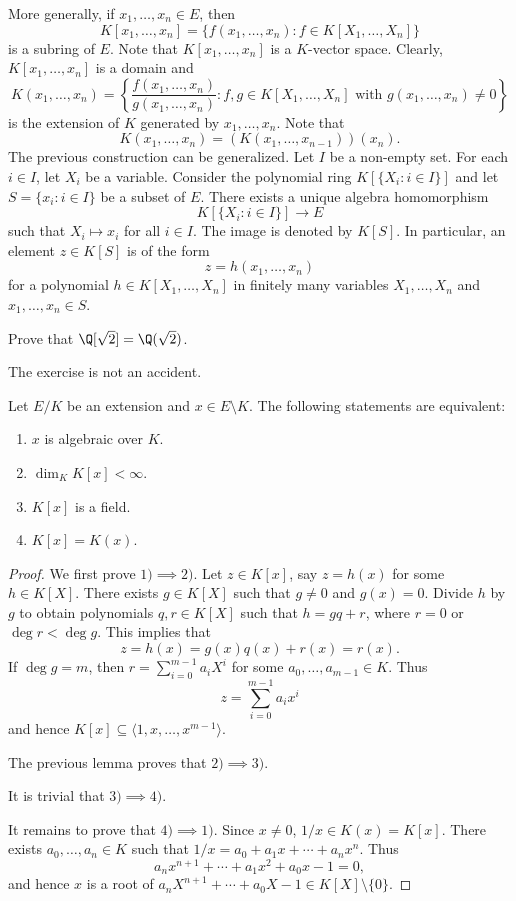 More generally,
if $x_1,\dots,x_n\in E$, then
\[
K[x_1,\dots,x_n]=\{f(x_1,\dots,x_n):f\in K[X_1,\dots,X_n]\}
\]
is a subring of $E$. 
Note that $K[x_1,\dots,x_n]$ is a $K$-vector space. 
Clearly, $K[x_1,\dots,x_n]$ is a domain
and 
\[
K(x_1,\dots,x_n)=\left\{\frac{f(x_1,\dots,x_n)}{g(x_1,\dots,x_n)}:f,g\in K[X_1,\dots,X_n]\text{ with $g(x_1,\dots,x_n)\ne 0$}\right\}
\]
is the extension of $K$ generated by $x_1,\dots,x_n$. 
Note that 
\[
K(x_1,\dots,x_n)=(K(x_1,\dots,x_{n-1}))(x_n).
\]
The previous construction
can be generalized. Let $I$ be a non-empty set. 
For each $i\in I$, let $X_i$ be a variable. Consider
the polynomial ring $K[\{X_i:i\in I\}]$ and let 
$S=\{x_i:i\in I\}$ be a subset of $E$. There exists a unique 
algebra homomorphism 
\[
K[\{X_i:i\in I\}]\to E
\]
such that $X_i\mapsto x_i$ for all $i\in I$. The image 
is denoted by $K[S]$. In particular, an element $z\in K[S]$ 
is of the form 
\[
z=h(x_1,\dots,x_n)
\]
for a polynomial $h\in K[X_1,\dots,X_n]$ 
in finitely many variables $X_1,\dots,X_n$ and 
$x_1,\dots,x_n\in S$. 

\begin{exercise}
\label{xca: Q[sqrt2]=Q(sqrt2)}
    Prove that $\Q[\sqrt{2}]=\Q(\sqrt{2})$. 
\end{exercise}

The exercise is not an accident. 

\begin{theorem}
\label{thm:simple extesnions}
	Let $E/K$ be an extension and $x\in E\setminus K$.
	The following statements are equivalent:
	\begin{enumerate}
		\item $x$ is algebraic over $K$.
		\item $\dim_KK[x]<\infty$.
		\item $K[x]$ is a field.
		\item $K[x]=K(x)$. 
	\end{enumerate}
\end{theorem}

\begin{proof}
	We first prove $1)\implies 2)$. Let $z\in K[x]$, say $z=h(x)$ for some $h\in K[X]$. There exists
	$g\in K[X]$ such that $g\ne 0$ and $g(x)=0$. Divide $h$ by $g$ to obtain 
	polynomials $q,r\in K[X]$ such that $h=gq+r$, where $r=0$ or $\deg r<\deg g$. This implies that
	\[
		z=h(x)=g(x)q(x)+r(x)=r(x).
	\]
	If $\deg g=m$, then $r=\sum_{i=0}^{m-1}a_iX^i$ for some $a_0,\dots,a_{m-1}\in K$. Thus
	\[
 z=\sum_{i=0}^{m-1}a_ix^i 
 \]
 and hence $K[x]\subseteq\langle 1,x,\dots,x^{m-1}\rangle$. 

	The previous lemma proves that $2)\implies 3)$. 

	It is trivial that $3)\implies 4)$. 

	It remains to prove that $4)\implies 1)$. 
	Since $x\ne 0$, $1/x\in K(x)=K[x]$. There exists $a_0,\dots,a_n\in K$ such that
	$1/x=a_0+a_1x+\cdots+a_nx^n$. Thus
	\[
		a_nx^{n+1}+\cdots+a_1x^2+a_0x-1=0, 
	\]
	and hence $x$ is a root of $a_nX^{n+1}+\cdots+a_0X-1\in K[X]\setminus\{0\}$. 
\end{proof}

